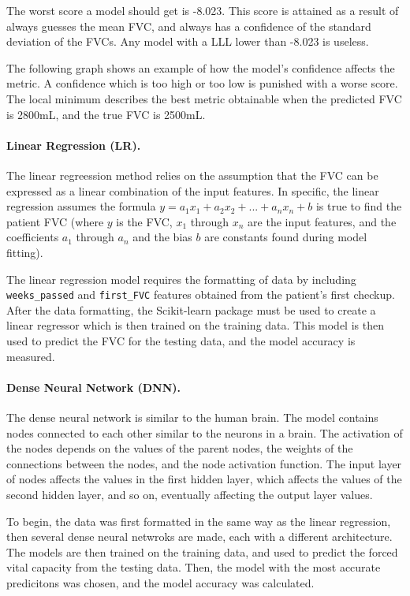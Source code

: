 \documentclass[12pt]{article}
\begin{document}
The worst score a model should get is -8.023. 
This score is attained as a result of always guesses the mean FVC, and always has a confidence of the standard deviation of the FVCs. 
Any model with a LLL lower than -8.023 is useless.

The following graph shows an example of how the model's confidence affects the metric. 
A confidence which is too high or too low is punished with a worse score. 
The local minimum describes the best metric obtainable when the predicted FVC is 2800mL, and the true FVC is 2500mL.

\paragraph*{Linear Regression (LR).}

The linear regreession method relies on the assumption that the FVC can be expressed as a linear combination of the input features. 
In specific, the linear regression assumes the formula $y = a_1 x_1 + a_2 x_2 + ... + a_n x_n + b$ is true to find the patient FVC (where $y$ is the FVC, $x_1$ through $x_n$ are the input features, and the coefficients $a_1$ through $a_n$ and the bias $b$ are constants found during model fitting). 

The linear regression model requires the formatting of data by including {\tt weeks\_passed} and {\tt first\_FVC} features obtained from the patient's first checkup.
After the data formatting, the Scikit-learn package must be used to create a linear regressor which is then trained on the training data.
This model is then used to predict the FVC for the testing data, and the model accuracy is measured.

\paragraph*{Dense Neural Network (DNN).}

The dense neural network is similar to the human brain. 
The model contains nodes connected to each other similar to the neurons in a brain. 
The activation of the nodes depends on the values of the parent nodes, the weights of the connections between the nodes, and the node activation function. 
The input layer of nodes affects the values in the first hidden layer, which affects the values of the second hidden layer, and so on, eventually affecting the output layer values.

To begin, the data was first formatted in the same way as the linear regression, then several dense neural netwroks are made, each with a different architecture.
The models are then trained on the training data, and used to predict the forced vital capacity from the testing data.
Then, the model with the most accurate predicitons was chosen, and the model accuracy was calculated.
\end{document}
